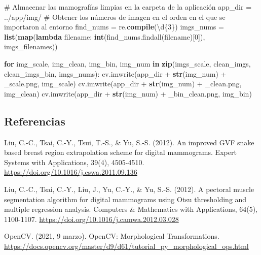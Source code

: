 \documentclass[
]{article}
\newenvironment{Shaded}{\begin{snugshade}}{\end{snugshade}}
\newcommand{\BuiltInTok}[1]{\textcolor[rgb]{0.39,0.29,0.61}{\textbf{#1}}}
\newcommand{\CommentTok}[1]{\textcolor[rgb]{0.54,0.53,0.53}{#1}}
\newcommand{\ControlFlowTok}[1]{\textcolor[rgb]{0.12,0.11,0.11}{\textbf{#1}}}
\newcommand{\DecValTok}[1]{\textcolor[rgb]{0.69,0.50,0.00}{#1}}
\newcommand{\KeywordTok}[1]{\textcolor[rgb]{0.12,0.11,0.11}{\textbf{#1}}}
\newcommand{\NormalTok}[1]{\textcolor[rgb]{0.12,0.11,0.11}{#1}}
\newcommand{\OperatorTok}[1]{\textcolor[rgb]{0.12,0.11,0.11}{#1}}
\newcommand{\SpecialCharTok}[1]{\textcolor[rgb]{0.24,0.68,0.91}{#1}}
\newcommand{\StringTok}[1]{\textcolor[rgb]{0.75,0.01,0.01}{#1}}
\begin{document}
\begin{Shaded}
\begin{Highlighting}[]
\CommentTok{\# Almacenar las mamografías limpias en la carpeta de la aplicación}
\NormalTok{app\_dir }\OperatorTok{=} \StringTok{\textquotesingle{}../app/img/\textquotesingle{}}
\CommentTok{\# Obtener los números de imagen en el orden en el que se importaron al entorno}
\NormalTok{find\_nums }\OperatorTok{=}\NormalTok{ re.}\BuiltInTok{compile}\NormalTok{(}\StringTok{\textquotesingle{}\textbackslash{}d}\SpecialCharTok{\{3\}}\StringTok{\textquotesingle{}}\NormalTok{)}
\NormalTok{imgs\_nums }\OperatorTok{=} \BuiltInTok{list}\NormalTok{(}\BuiltInTok{map}\NormalTok{(}\KeywordTok{lambda}\NormalTok{ filename: }\BuiltInTok{int}\NormalTok{(find\_nums.findall(filename)[}\DecValTok{0}\NormalTok{]), imgs\_filenames))}

\ControlFlowTok{for}\NormalTok{ img\_scale, img\_clean, img\_bin, img\_num }\KeywordTok{in} \BuiltInTok{zip}\NormalTok{(imgs\_scale, clean\_imgs, clean\_imgs\_bin, imgs\_nums):}
\NormalTok{    cv.imwrite(app\_dir }\OperatorTok{+} \BuiltInTok{str}\NormalTok{(img\_num) }\OperatorTok{+} \StringTok{\textquotesingle{}\_scale.png\textquotesingle{}}\NormalTok{, img\_scale)}
\NormalTok{    cv.imwrite(app\_dir }\OperatorTok{+} \BuiltInTok{str}\NormalTok{(img\_num) }\OperatorTok{+} \StringTok{\textquotesingle{}\_clean.png\textquotesingle{}}\NormalTok{, img\_clean)}
\NormalTok{    cv.imwrite(app\_dir }\OperatorTok{+} \BuiltInTok{str}\NormalTok{(img\_num) }\OperatorTok{+} \StringTok{\textquotesingle{}\_bin\_clean.png\textquotesingle{}}\NormalTok{, img\_bin)}
\end{Highlighting}
\end{Shaded}

\hypertarget{referencias}{%
\subsection{Referencias}\label{referencias}}

Liu, C.-C., Tsai, C.-Y., Tsui, T.-S., \& Yu, S.-S. (2012). An improved
GVF snake based breast region extrapolation scheme for digital
mammograms. Expert Systems with Applications, 39(4), 4505-4510.
\url{https://doi.org/10.1016/j.eswa.2011.09.136}

Liu, C.-C., Tsai, C.-Y., Liu, J., Yu, C.-Y., \& Yu, S.-S. (2012). A
pectoral muscle segmentation algorithm for digital mammograms using Otsu
thresholding and multiple regression analysis. Computers \& Mathematics
with Applications, 64(5), 1100-1107.
\url{https://doi.org/10.1016/j.camwa.2012.03.028}

OpenCV. (2021, 9 marzo). OpenCV: Morphological Transformations.
\url{https://docs.opencv.org/master/d9/d61/tutorial_py_morphological_ops.html}
\end{document}
